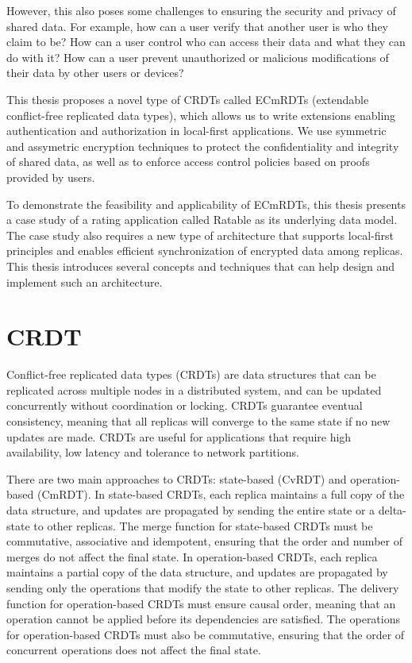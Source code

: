 \documentclass[
	ngerman,
	ruledheaders=section,   %
	class=report,		    %
	thesis={type=bachelor}, %
	accentcolor=9c,			%
	custommargins=true,    %
	marginpar=false,        %
	parskip=half-,          %
	fontsize=11pt,          %
]{tudapub}
\begin{document}
However, this also poses some challenges to ensuring the security and privacy of shared data. For example, how can a user verify that another user is who they claim to be? How can a user control who can access their data and what they can do with it? How can a user prevent unauthorized or malicious modifications of their data by other users or devices?

This thesis proposes a novel type of CRDTs called ECmRDTs (extendable conflict-free replicated data types), which allows us to write extensions enabling authentication and authorization in local-first applications. We use symmetric and assymetric encryption techniques to protect the confidentiality and integrity of shared data, as well as to enforce access control policies based on proofs provided by users. 

To demonstrate the feasibility and applicability of ECmRDTs, this thesis presents a case study of a rating application called Ratable as its underlying data model. The case study also requires a new type of architecture that supports local-first principles and enables efficient synchronization of encrypted data among replicas. This thesis introduces several concepts and techniques that can help design and implement such an architecture.

\section{CRDT}
Conflict-free replicated data types (CRDTs) are data structures that can be replicated across multiple nodes in a distributed system, and can be updated concurrently without coordination or locking. CRDTs guarantee eventual consistency, meaning that all replicas will converge to the same state if no new updates are made. CRDTs are useful for applications that require high availability, low latency and tolerance to network partitions.

There are two main approaches to CRDTs: state-based (CvRDT) and operation-based (CmRDT). In state-based CRDTs, each replica maintains a full copy of the data structure, and updates are propagated by sending the entire state or a delta-state to other replicas. The merge function for state-based CRDTs must be commutative, associative and idempotent, ensuring that the order and number of merges do not affect the final state. In operation-based CRDTs, each replica maintains a partial copy of the data structure, and updates are propagated by sending only the operations that modify the state to other replicas. The delivery function for operation-based CRDTs must ensure causal order, meaning that an operation cannot be applied before its dependencies are satisfied. The operations for operation-based CRDTs must also be commutative, ensuring that the order of concurrent operations does not affect the final state.
\end{document}
